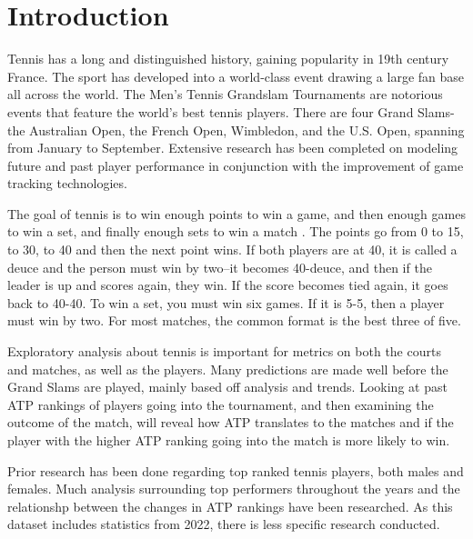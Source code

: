 \documentclass[12pt]{article}
\begin{document}
\section{Introduction}
\label{sec:intro}

Tennis has a long and distinguished history, gaining popularity in
19th century France. The sport has developed into a world-class event
drawing a large fan base all across the world. The Men's Tennis Grandslam 
Tournaments are notorious events that feature the world's best tennis players. 
There are four Grand Slams- the Australian Open, the French Open, Wimbledon, 
and the U.S. Open, spanning from January to September. Extensive research has 
been completed on modeling future and past player performance in conjunction 
with the improvement of game tracking technologies.

The goal of tennis is to win enough points to win a game, and then enough games 
to win a set, and finally enough sets to win a match \citet{Ifttennis2021Grand}. 
The points go from 0 to 15, to 30, to 40 and then the next point wins. If both 
players are at 40, it is called a deuce and the person must win by two--it becomes 
40-deuce, and then if the leader is up and scores again, they win. If the score 
becomes tied again, it goes back to 40-40. To win a set, you must win six games. 
If it is 5-5, then a player must win by two. For most matches, the common format 
is the best three of five. 

Exploratory analysis about tennis is important for metrics on both the
courts and matches, as well as the players. Many predictions are made well 
before the Grand Slams are played, mainly based off analysis and trends. 
Looking at past ATP rankings of players going into the tournament, and then 
examining the outcome of the match, will reveal how ATP translates to the 
matches and if the player with the higher ATP ranking going into the match 
is more likely to win.

Prior research has been done regarding top ranked tennis players, both males and 
females. Much analysis surrounding top performers throughout the years and the 
relationshp between the changes in ATP rankings have been researched. As this 
dataset includes statistics from 2022, there is less specific research conducted.
\end{document}
